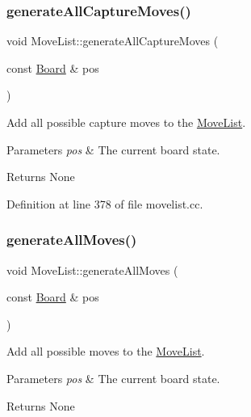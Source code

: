 \subsubsection{\texorpdfstring{generate\+All\+Capture\+Moves()}{generateAllCaptureMoves()}}
{\footnotesize\ttfamily void Move\+List\+::generate\+All\+Capture\+Moves (\begin{DoxyParamCaption}\item[{const \mbox{\hyperlink{classBoard}{Board}} \&}]{pos }\end{DoxyParamCaption})\hspace{0.3cm}{\ttfamily [noexcept]}}



Add all possible capture moves to the \mbox{\hyperlink{classMoveList}{Move\+List}}. 


\begin{DoxyParams}{Parameters}
{\em pos} & The current board state. \\
\hline
\end{DoxyParams}
\begin{DoxyReturn}{Returns}
None 
\end{DoxyReturn}


Definition at line 378 of file movelist.\+cc.

\mbox{\label{classMoveList_a6453c799251a6809fcf9312df1ad0814}} 
\subsubsection{\texorpdfstring{generate\+All\+Moves()}{generateAllMoves()}}
{\footnotesize\ttfamily void Move\+List\+::generate\+All\+Moves (\begin{DoxyParamCaption}\item[{const \mbox{\hyperlink{classBoard}{Board}} \&}]{pos }\end{DoxyParamCaption})\hspace{0.3cm}{\ttfamily [noexcept]}}



Add all possible moves to the \mbox{\hyperlink{classMoveList}{Move\+List}}. 


\begin{DoxyParams}{Parameters}
{\em pos} & The current board state. \\
\hline
\end{DoxyParams}
\begin{DoxyReturn}{Returns}
None 
\end{DoxyReturn}


